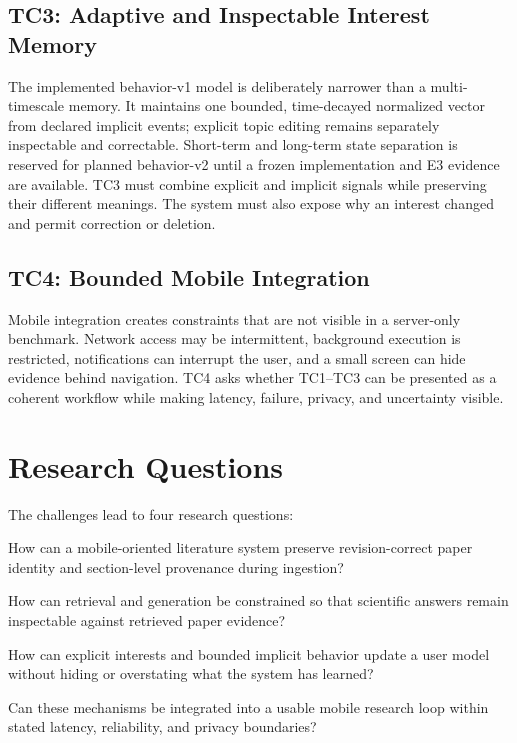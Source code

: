 \subsection{TC3: Adaptive and Inspectable Interest Memory}

The implemented behavior-v1 model is deliberately narrower than a multi-timescale memory.
It maintains one bounded, time-decayed normalized vector from declared implicit events; explicit topic editing remains separately inspectable and correctable.
Short-term and long-term state separation is reserved for planned behavior-v2 until a frozen implementation and E3 evidence are available.
TC3 must combine explicit and implicit signals while preserving their different meanings.
The system must also expose why an interest changed and permit correction or deletion.

\subsection{TC4: Bounded Mobile Integration}

Mobile integration creates constraints that are not visible in a server-only benchmark.
Network access may be intermittent, background execution is restricted, notifications can interrupt the user, and a small screen can hide evidence behind navigation.
TC4 asks whether TC1--TC3 can be presented as a coherent workflow while making latency, failure, privacy, and uncertainty visible.

\section{Research Questions}

The challenges lead to four research questions:

\begin{description}[leftmargin=2.3cm,style=nextline]
  \item[RQ1] How can a mobile-oriented literature system preserve revision-correct paper identity and section-level provenance during ingestion?
  \item[RQ2] How can retrieval and generation be constrained so that scientific answers remain inspectable against retrieved paper evidence?
  \item[RQ3] How can explicit interests and bounded implicit behavior update a user model without hiding or overstating what the system has learned?
  \item[RQ4] Can these mechanisms be integrated into a usable mobile research loop within stated latency, reliability, and privacy boundaries?
\end{description}

